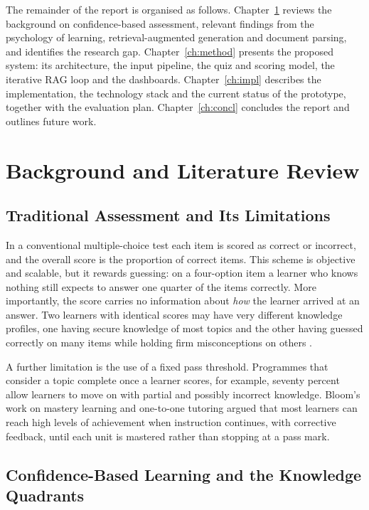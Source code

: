 \documentclass[12pt,a4paper,oneside]{report}
\begin{document}
The remainder of the report is organised as follows.
Chapter~\ref{ch:lit} reviews the background on confidence-based assessment,
relevant findings from the psychology of learning, retrieval-augmented
generation and document parsing, and identifies the research gap.
Chapter~\ref{ch:method} presents the proposed system: its architecture,
the input pipeline, the quiz and scoring model, the iterative RAG loop and
the dashboards. Chapter~\ref{ch:impl} describes the implementation, the
technology stack and the current status of the prototype, together with
the evaluation plan. Chapter~\ref{ch:concl} concludes the report and
outlines future work.

\chapter{Background and Literature Review}\label{ch:lit}

\section{Traditional Assessment and Its Limitations}

In a conventional multiple-choice test each item is scored as correct or
incorrect, and the overall score is the proportion of correct items. This
scheme is objective and scalable, but it rewards guessing: on a
four-option item a learner who knows nothing still expects to answer one
quarter of the items correctly. More importantly, the score carries no
information about \emph{how} the learner arrived at an answer. Two learners
with identical scores may have very different knowledge profiles, one
having secure knowledge of most topics and the other having guessed
correctly on many items while holding firm misconceptions on others
\cite{benchprep}.

A further limitation is the use of a fixed pass threshold. Programmes that
consider a topic complete once a learner scores, for example, seventy
percent allow learners to move on with partial and possibly incorrect
knowledge. Bloom's work on mastery learning and one-to-one tutoring
\cite{bloom1984} argued that most learners can reach high levels of
achievement when instruction continues, with corrective feedback, until
each unit is mastered rather than stopping at a pass mark.

\section{Confidence-Based Learning and the Knowledge Quadrants}
\end{document}
